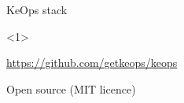 \documentclass[12pt,aspectratio=1610]{beamer}
\begin{document}
\begin{frame}{KeOps stack}

\begin{onlyenv}<1>
\begin{center}
\url{https://github.com/getkeops/keops}\bigskip

Open source (MIT licence)
\end{center}
\end{onlyenv}

%
\end{frame}


%
%
\end{document}
